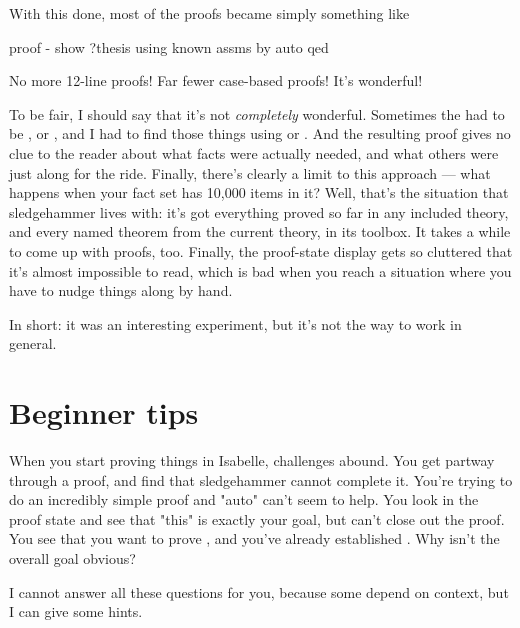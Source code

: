 With this done, most of the proofs became simply something like
\begin{IS}
proof -
  show ?thesis using known assms by auto
qed
\end{IS}
No more 12-line proofs! Far fewer case-based proofs! It's wonderful! 

To be fair, I should say that it's not \textit{completely} wonderful. Sometimes the  had to be , or , and I had to find those things using  or . And the resulting proof gives no clue to the reader about what facts were actually needed, and what others were just along for the ride. Finally, there's clearly a limit to this approach --- what happens when your fact set has 10,000 items in it? Well, that's the situation that sledgehammer lives with: it's got everything proved so far in any included theory, and every named theorem from the current theory, in its toolbox. It takes a while to come up with proofs, too. Finally, the proof-state display gets so cluttered that it's almost impossible to read, which is bad when you reach a situation where you have to nudge things along by hand. 

In short: it was an interesting experiment, but it's not the way to work in general. 

\section{Beginner tips}
When you start proving things in Isabelle, challenges abound. You get partway through a proof, and find that sledgehammer cannot complete it. You're trying to do an incredibly simple proof and "auto" can't seem to help. You look in the proof state and see that "this" is exactly your goal, but can't close out the proof. You see that you want to prove , and you've already established . Why isn't the overall goal obvious? 

I cannot answer all these questions for you, because some depend on context, but I can give some hints. 

